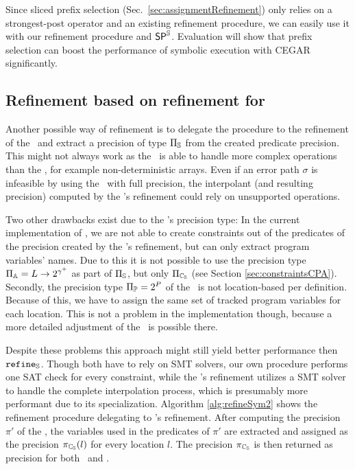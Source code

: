 Since sliced prefix selection (Sec.~\ref{sec:assignmentRefinement}) only relies on a strongest-post operator and an existing refinement procedure, we can easily use it with our refinement procedure and $\operatorname{\operatorname{\operatorname{\mathsf{SP}}}^{\mathbb{S}}}$.
Evaluation will show that prefix selection can boost the performance of symbolic execution with CEGAR significantly.

\subsection{Refinement based on refinement for \predicateCPA}
\label{sec:predicateRefinement}
Another possible way of refinement is to delegate the procedure to the refinement of the \predicateCPA\ and extract  a precision of type $\Pi_{\mathbb{S}}$ from the created predicate precision.
This might not always work as the \predicateCPA\ is able to handle more complex operations than the \symbolicExecutionCPA, for example non-deterministic arrays.
Even if an error path $\sigma$ is infeasible by using the \symbolicExecutionCPA\ with full precision, the interpolant (and resulting precision) computed by the \predicateCPA 's refinement could rely on unsupported operations.

Two other drawbacks exist due to the \predicateCPA's precision type:
In the current implementation of \CpaChecker, we are not able to create constraints out of the predicates of the precision created by the \predicateCPA's refinement, but can only extract program variables' names.
Due to this it is not possible to use the precision type $\Pi_{\mathbb{A}} = L \rightarrow 2^{\gamma^+}$ as part of $\Pi_{\mathbb{S}}$, but only $\Pi_{\mathbb{C_{S}}}$ (see Section \ref{sec:constraintsCPA}).
Secondly, the precision type $\Pi_{\mathbb{P}} = 2^P$ of the \predicateCPA\ is not location-based per definition. Because of this, we have to assign the same set of tracked program variables for each location.
This is not a problem in the implementation though, because a more detailed adjustment of the \predicateCPA\ is possible there.

Despite these problems this approach might still yield better performance then $\texttt{refine}_{\mathbb{S}}$.
Though both have to rely on SMT solvers, our own procedure performs one SAT check for every constraint, while the \predicateCPA's refinement utilizes a SMT solver to handle the complete interpolation process, which is presumably more performant due to its specialization.
Algorithm \ref{alg:refineSym2} shows the refinement procedure delegating to \predicateCPA's refinement.
After computing the precision $\pi'$ of the \predicateCPA, the variables used in the predicates of $\pi'$ are extracted and assigned as the precision $\pi_{\mathbb{C_{S}}}(l)$ for every location $l$. The precision $\pi_{\mathbb{C_{S}}}$ is then returned as precision for both \symbolicValueAnalysisCPA\ and \constraintsCPA.

